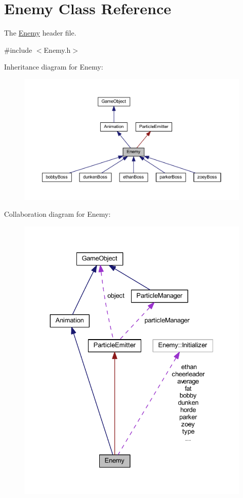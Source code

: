 \hypertarget{class_enemy}{\section{Enemy Class Reference}
\label{class_enemy}
}


The \hyperlink{class_enemy}{Enemy} header file.  




{\ttfamily \#include $<$Enemy.\+h$>$}



Inheritance diagram for Enemy\+:\nopagebreak
\begin{figure}[H]
\begin{center}
\leavevmode
\includegraphics[width=350pt]{class_enemy__inherit__graph}
\end{center}
\end{figure}


Collaboration diagram for Enemy\+:\nopagebreak
\begin{figure}[H]
\begin{center}
\leavevmode
\includegraphics[width=330pt]{class_enemy__coll__graph}
\end{center}
\end{figure}
